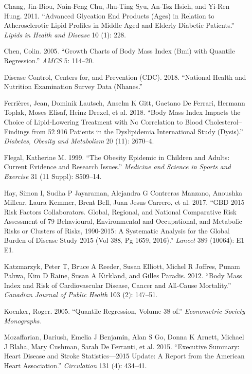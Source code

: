 \documentclass[
  12pt,
]{article}
\begin{document}
\leavevmode\hypertarget{ref-chang2011}{}%
Chang, Jin-Biou, Nain-Feng Chu, Jhu-Ting Syu, An-Tsz Hsieh, and Yi-Ren Hung. 2011. ``Advanced Glycation End Products (Ages) in Relation to Atherosclerotic Lipid Profiles in Middle-Aged and Elderly Diabetic Patients.'' \emph{Lipids in Health and Disease} 10 (1): 228.

\leavevmode\hypertarget{ref-chen2005}{}%
Chen, Colin. 2005. ``Growth Charts of Body Mass Index (Bmi) with Quantile Regression.'' \emph{AMCS} 5: 114--20.

\leavevmode\hypertarget{ref-NHANES}{}%
Disease Control, Centers for, and Prevention (CDC). 2018. ``National Health and Nutrition Examination Survey Data (Nhanes.''

\leavevmode\hypertarget{ref-ferrieres2018}{}%
Ferrières, Jean, Dominik Lautsch, Anselm K Gitt, Gaetano De Ferrari, Hermann Toplak, Moses Elisaf, Heinz Drexel, et al. 2018. ``Body Mass Index Impacts the Choice of Lipid-Lowering Treatment with No Correlation to Blood Cholesterol--Findings from 52 916 Patients in the Dyslipidemia International Study (Dysis).'' \emph{Diabetes, Obesity and Metabolism} 20 (11): 2670--4.

\leavevmode\hypertarget{ref-flegal1999}{}%
Flegal, Katherine M. 1999. ``The Obesity Epidemic in Children and Adults: Current Evidence and Research Issues.'' \emph{Medicine and Science in Sports and Exercise} 31 (11 Suppl): S509--14.

\leavevmode\hypertarget{ref-hay2017gbd}{}%
Hay, Simon I, Sudha P Jayaraman, Alejandra G Contreras Manzano, Anoushka Millear, Laura Kemmer, Brent Bell, Juan Jesus Carrero, et al. 2017. ``GBD 2015 Risk Factors Collaborators. Global, Regional, and National Comparative Risk Assessment of 79 Behavioural, Environmental and Occupational, and Metabolic Risks or Clusters of Risks, 1990-2015: A Systematic Analysis for the Global Burden of Disease Study 2015 (Vol 388, Pg 1659, 2016).'' \emph{Lancet} 389 (10064): E1--E1.

\leavevmode\hypertarget{ref-katbody}{}%
Katzmarzyk, Peter T, Bruce A Reeder, Susan Elliott, Michel R Joffres, Punam Pahwa, Kim D Raine, Susan A Kirkland, and Gilles Paradis. 2012. ``Body Mass Index and Risk of Cardiovascular Disease, Cancer and All-Cause Mortality.'' \emph{Canadian Journal of Public Health} 103 (2): 147--51.

\leavevmode\hypertarget{ref-koenker2005}{}%
Koenker, Roger. 2005. ``Quantile Regression, Volume 38 of.'' \emph{Econometric Society Monographs}.

\leavevmode\hypertarget{ref-mozaffarian2015executive}{}%
Mozaffarian, Dariush, Emelia J Benjamin, Alan S Go, Donna K Arnett, Michael J Blaha, Mary Cushman, Sarah De Ferranti, et al. 2015. ``Executive Summary: Heart Disease and Stroke Statistics---2015 Update: A Report from the American Heart Association.'' \emph{Circulation} 131 (4): 434--41.
\end{document}
